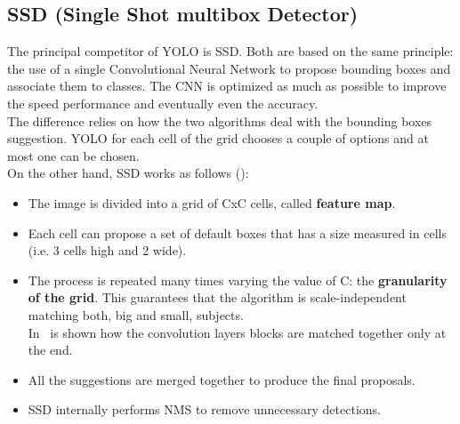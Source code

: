 \subsection{SSD (Single Shot multibox Detector)} \label{sec:ssd}
The principal competitor of YOLO is SSD\cite{ssd}. Both are based on the same principle: the use of a single Convolutional Neural Network to propose bounding boxes and associate them to classes. The CNN is optimized as much as possible to improve the speed performance and eventually even the accuracy.\\
The difference relies on how the two algorithms deal with the bounding boxes suggestion. YOLO for each cell of the grid chooses a couple of options and at most one can be chosen.\\
On the other hand, SSD works as follows ():
\begin{itemize}
	\item The image is divided into a grid of CxC cells, called \textbf{feature map}.
	\item Each cell can propose a set of default boxes that has a size measured in cells (i.e. 3 cells high and 2 wide).
	\item The process is repeated many times varying the value of C: the \textbf{granularity of the grid}. This guarantees that the algorithm is scale-independent matching both, big and small, subjects.\\
	In~ is shown how the convolution layers blocks are matched together only at the end.
	\item All the suggestions are merged together to produce the final proposals.
	\item SSD internally performs NMS to remove unnecessary detections.
\end{itemize}

